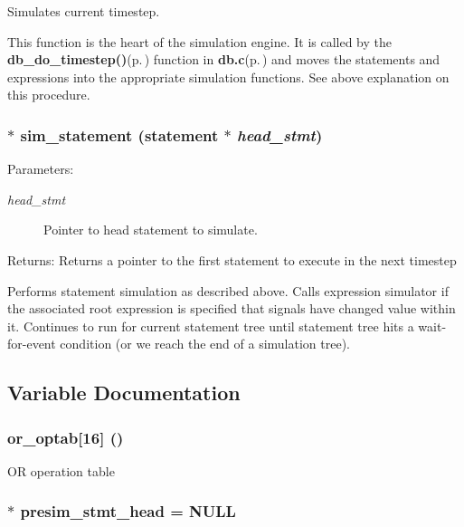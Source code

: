 Simulates current timestep. 

This function is the heart of the simulation engine. It is called by the {\bf db\_\-do\_\-timestep()}{\rm (p.\,\pageref{db_8c_a45})} function in {\bf db.c}{\rm (p.\,\pageref{db_8c})} and moves the statements and expressions into the appropriate simulation functions. See above explanation on this procedure. 
\subsubsection{$\ast$ sim\_\-statement ({\bf statement} $\ast$ {\em head\_\-stmt})}\label{sim_8c_a10}


\begin{Desc}
\item[Parameters:]
\begin{description}
\item[{\em head\_\-stmt}]Pointer to head statement to simulate.\end{description}
\end{Desc}
\begin{Desc}
\item[Returns:]Returns a pointer to the first statement to execute in the next timestep\end{Desc}
Performs statement simulation as described above. Calls expression simulator if the associated root expression is specified that signals have changed value within it. Continues to run for current statement tree until statement tree hits a wait-for-event condition (or we reach the end of a simulation tree). 

\subsection{Variable Documentation}
\subsubsection{ {\bf or\_\-optab}[16] ()}\label{sim_8c_a0}


OR operation table 
\subsubsection{$\ast$ {\bf presim\_\-stmt\_\-head} = NULL}\label{sim_8c_a3}


